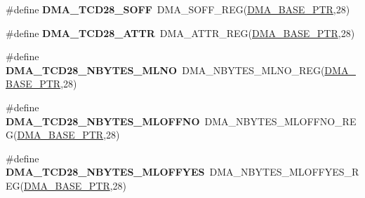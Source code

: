 \begin{DoxyCompactItemize}
\item 
\hypertarget{group___d_m_a___register___accessor___macros_gacca13b2583361098a4ad0bd854da5dc6}{}\#define {\bfseries D\+M\+A\+\_\+\+T\+C\+D28\+\_\+\+S\+O\+F\+F}~D\+M\+A\+\_\+\+S\+O\+F\+F\+\_\+\+R\+E\+G(\hyperlink{group___d_m_a___peripheral_ga6997fbc1b1973e9f27170217a3bd6f22}{D\+M\+A\+\_\+\+B\+A\+S\+E\+\_\+\+P\+T\+R},28)\label{group___d_m_a___register___accessor___macros_gacca13b2583361098a4ad0bd854da5dc6}

\item 
\hypertarget{group___d_m_a___register___accessor___macros_ga31909d3332698c2b134e8257c21518fb}{}\#define {\bfseries D\+M\+A\+\_\+\+T\+C\+D28\+\_\+\+A\+T\+T\+R}~D\+M\+A\+\_\+\+A\+T\+T\+R\+\_\+\+R\+E\+G(\hyperlink{group___d_m_a___peripheral_ga6997fbc1b1973e9f27170217a3bd6f22}{D\+M\+A\+\_\+\+B\+A\+S\+E\+\_\+\+P\+T\+R},28)\label{group___d_m_a___register___accessor___macros_ga31909d3332698c2b134e8257c21518fb}

\item 
\hypertarget{group___d_m_a___register___accessor___macros_gac879d36c89f786ae4c58c2b20bcc018b}{}\#define {\bfseries D\+M\+A\+\_\+\+T\+C\+D28\+\_\+\+N\+B\+Y\+T\+E\+S\+\_\+\+M\+L\+N\+O}~D\+M\+A\+\_\+\+N\+B\+Y\+T\+E\+S\+\_\+\+M\+L\+N\+O\+\_\+\+R\+E\+G(\hyperlink{group___d_m_a___peripheral_ga6997fbc1b1973e9f27170217a3bd6f22}{D\+M\+A\+\_\+\+B\+A\+S\+E\+\_\+\+P\+T\+R},28)\label{group___d_m_a___register___accessor___macros_gac879d36c89f786ae4c58c2b20bcc018b}

\item 
\hypertarget{group___d_m_a___register___accessor___macros_ga95767a8ca2fa819e40f3c4ba403fab2d}{}\#define {\bfseries D\+M\+A\+\_\+\+T\+C\+D28\+\_\+\+N\+B\+Y\+T\+E\+S\+\_\+\+M\+L\+O\+F\+F\+N\+O}~D\+M\+A\+\_\+\+N\+B\+Y\+T\+E\+S\+\_\+\+M\+L\+O\+F\+F\+N\+O\+\_\+\+R\+E\+G(\hyperlink{group___d_m_a___peripheral_ga6997fbc1b1973e9f27170217a3bd6f22}{D\+M\+A\+\_\+\+B\+A\+S\+E\+\_\+\+P\+T\+R},28)\label{group___d_m_a___register___accessor___macros_ga95767a8ca2fa819e40f3c4ba403fab2d}

\item 
\hypertarget{group___d_m_a___register___accessor___macros_ga1cbe137f041d1ee89c6c8d06398a97c4}{}\#define {\bfseries D\+M\+A\+\_\+\+T\+C\+D28\+\_\+\+N\+B\+Y\+T\+E\+S\+\_\+\+M\+L\+O\+F\+F\+Y\+E\+S}~D\+M\+A\+\_\+\+N\+B\+Y\+T\+E\+S\+\_\+\+M\+L\+O\+F\+F\+Y\+E\+S\+\_\+\+R\+E\+G(\hyperlink{group___d_m_a___peripheral_ga6997fbc1b1973e9f27170217a3bd6f22}{D\+M\+A\+\_\+\+B\+A\+S\+E\+\_\+\+P\+T\+R},28)\label{group___d_m_a___register___accessor___macros_ga1cbe137f041d1ee89c6c8d06398a97c4}


\end{DoxyCompactItemize}
